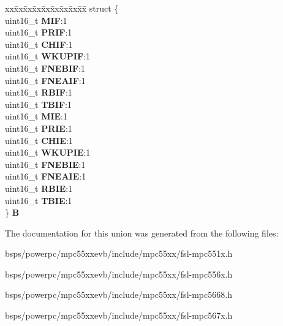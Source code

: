 \begin{DoxyCompactItemize}
\begin{tabbing}
\end{tabbing}\item 
\mbox{\label{unionuGIFER_aa890e787d90c466225c83a5878a1600d}} 
\begin{tabbing}
xx\=xx\=xx\=xx\=xx\=xx\=xx\=xx\=xx\=\kill
struct \{\\
\>uint16\_t {\bfseries MIF}:1\\
\>uint16\_t {\bfseries PRIF}:1\\
\>uint16\_t {\bfseries CHIF}:1\\
\>uint16\_t {\bfseries WKUPIF}:1\\
\>uint16\_t {\bfseries FNEBIF}:1\\
\>uint16\_t {\bfseries FNEAIF}:1\\
\>uint16\_t {\bfseries RBIF}:1\\
\>uint16\_t {\bfseries TBIF}:1\\
\>uint16\_t {\bfseries MIE}:1\\
\>uint16\_t {\bfseries PRIE}:1\\
\>uint16\_t {\bfseries CHIE}:1\\
\>uint16\_t {\bfseries WKUPIE}:1\\
\>uint16\_t {\bfseries FNEBIE}:1\\
\>uint16\_t {\bfseries FNEAIE}:1\\
\>uint16\_t {\bfseries RBIE}:1\\
\>uint16\_t {\bfseries TBIE}:1\\
\} {\bfseries B}\\

\end{tabbing}\end{DoxyCompactItemize}


The documentation for this union was generated from the following files\+:\begin{DoxyCompactItemize}
\item 
bsps/powerpc/mpc55xxevb/include/mpc55xx/fsl-\/mpc551x.\+h\item 
bsps/powerpc/mpc55xxevb/include/mpc55xx/fsl-\/mpc556x.\+h\item 
bsps/powerpc/mpc55xxevb/include/mpc55xx/fsl-\/mpc5668.\+h\item 
bsps/powerpc/mpc55xxevb/include/mpc55xx/fsl-\/mpc567x.\+h\end{DoxyCompactItemize}

